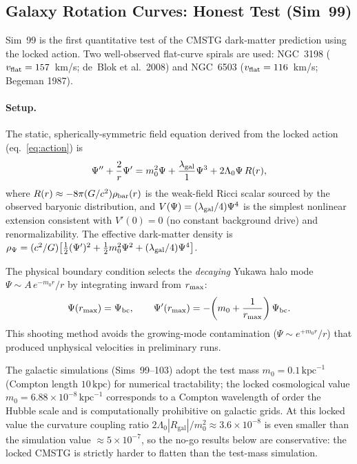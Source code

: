 \documentclass[12pt,a4paper]{article}
\begin{document}
\subsection{Galaxy Rotation Curves: Honest Test (Sim~99)}
\label{sec:sim99}

Sim~99 is the first quantitative test of the CMSTG dark-matter prediction
using the locked action.  Two well-observed flat-curve spirals are used:
NGC~3198 ($v_{\rm flat} = 157$~km/s; de~Blok et al.\ 2008) and
NGC~6503 ($v_{\rm flat} = 116$~km/s; Begeman 1987).

\paragraph{Setup.}
The static, spherically-symmetric field equation derived from the locked
action (eq.~\ref{eq:action}) is
\begin{equation}
  \Psi'' + \frac{2}{r}\Psi' = m_0^2\Psi + \frac{\lambda_{\rm gal}}{1}\Psi^3
    + 2\Lambda_0\Psi\,R(r),
\label{eq:psi_galactic}
\end{equation}
where $R(r) \approx -8\pi(G/c^2)\rho_{\rm bar}(r)$ is the weak-field
Ricci scalar sourced by the observed baryonic distribution, and
$V(\Psi) = (\lambda_{\rm gal}/4)\Psi^4$ is the simplest nonlinear
extension consistent with $V'(0) = 0$ (no constant background drive) and
renormalizability.  The effective dark-matter density is
$\rho_\Psi = (c^2/G)\bigl[\tfrac{1}{2}(\Psi')^2 + \tfrac{1}{2}m_0^2\Psi^2
+ (\lambda_{\rm gal}/4)\Psi^4\bigr]$.

The physical boundary condition selects the \emph{decaying} Yukawa halo
mode $\Psi \sim A\,e^{-m_0 r}/r$ by integrating inward from $r_{\rm max}$:
\begin{equation}
  \Psi(r_{\rm max}) = \Psi_{\rm bc}, \qquad
  \Psi'(r_{\rm max}) = -\!\left(m_0 + \frac{1}{r_{\rm max}}\right)\Psi_{\rm bc}.
\end{equation}
This shooting method avoids the growing-mode contamination
($\Psi \sim e^{+m_0 r}/r$) that produced unphysical velocities
in preliminary runs.

The galactic simulations (Sims~99--103) adopt the test mass
$m_0 = 0.1\,\mathrm{kpc}^{-1}$ (Compton length $10\,\mathrm{kpc}$)
for numerical tractability; the locked cosmological value
$m_0 = 6.88\times10^{-8}\,\mathrm{kpc}^{-1}$ corresponds to a Compton
wavelength of order the Hubble scale and is computationally prohibitive on
galactic grids. At this locked value the curvature coupling ratio
$2\Lambda_0|R_\mathrm{gal}|/m_0^2 \approx 3.6\times10^{-8}$ is even
smaller than the simulation value $\approx5\times10^{-7}$, so the no-go
results below are conservative: the locked CMSTG is strictly harder to
flatten than the test-mass simulation.
\end{document}
